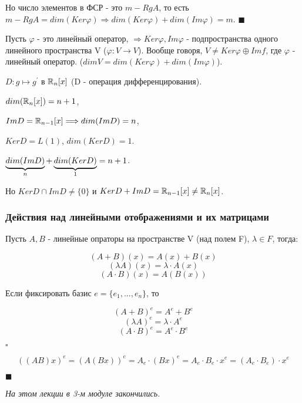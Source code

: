 \documentclass[../main.tex]{subfiles}
\begin{document}
Но число элементов в ФСР - это $m - RgA$, то есть $m - RgA = dim(Ker\varphi)\Longrightarrow dim(Ker\varphi) + dim(Im\varphi) = m$.
$\blacksquare$

\void{} Пусть $\varphi$ - это линейный оператор, $\Longrightarrow Ker\varphi, Im\varphi$ - подпространства одного
линейного пространства V ($\varphi: V\rightarrow V$). Вообще говоря, $V\neq Ker\varphi\oplus Im f$, где
$\varphi$ - линейный оператор. ($dimV = dim(Ker\varphi) + dim(Im\varphi)$).

\void{} $D: g\mapsto g^{'}$ в $\mathbb{R}_n[x]$ (D - операция дифференцирования).

$dim(\mathbb{R}_n[x]) = n+1$,

$ImD = \mathbb{R}_{n-1}[x]\Longrightarrow dim(ImD) = n$,

$KerD = L(1)$, $dim(KerD) = 1$.

$\underbrace{dim(ImD)}_{n} + \underbrace{dim(KerD)}_{1} = n+1$.

Но $KerD\cap ImD\neq \{0\}$ и $KerD+ImD = \mathbb{R}_{n-1}[x]\neq \mathbb{R}_n[x]$.

\subsubsection{Действия над линейными отображениями и их матрицами}

\void{} Пусть $A, B$ - линейные опраторы на пространстве V (над полем F), $\lambda\in F$, тогда:

$$(A+B)(x) = A(x)+B(x)$$
$$(\lambda A)(x) = \lambda\cdot A(x)$$
$$(A\cdot B)(x) = A(B(x))$$

\void{} Если фиксировать базис $e = \{e_1,...,e_n\}$, то

$$(A+B)^e = A^e + B^e$$
$$(\lambda A)^e = \lambda\cdot A^e$$
$$(A\cdot B)^e = A^e\cdot B^e$$

\void $\square$

$$((AB)x)^e = (A(Bx))^e = A_e\cdot(Bx)^e = A_e\cdot B_e\cdot x^e = (A_e\cdot B_e)\cdot x^e$$

$\blacksquare$

\void\textit{На этом лекции в 3-м модуле закончились.}
\end{document}
